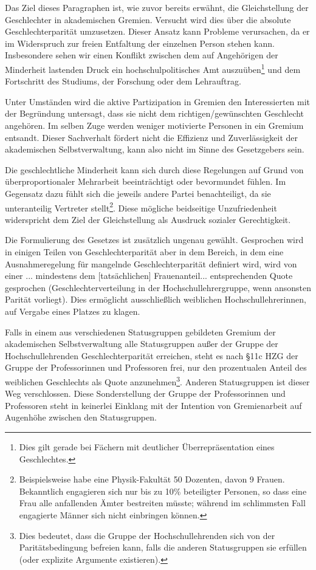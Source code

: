 \documentclass[DIV=calc]{scrartcl}
\begin{document}
Das Ziel dieses Paragraphen ist, wie zuvor bereits erwähnt, die Gleichstellung der
Geschlechter in akademischen Gremien. Versucht wird dies über die absolute Geschlechterparität
umzusetzen. Dieser Ansatz kann Probleme verursachen, da er im Widerspruch
zur freien Entfaltung der einzelnen Person stehen kann. Insbesondere sehen wir einen
Konflikt zwischen dem auf Angehörigen der Minderheit lastenden Druck ein hochschulpolitisches
Amt auszuüben\footnote{Dies gilt gerade bei Fächern mit deutlicher Überrepräsentation eines Geschlechtes.}
und dem Fortschritt des Studiums, der Forschung oder dem Lehrauftrag.

Unter Umständen wird die aktive Partizipation in Gremien den Interessierten mit der
Begründung untersagt, dass sie nicht dem richtigen/gewünschten Geschlecht angehören.
Im selben Zuge werden weniger motivierte Personen in ein Gremium entsandt. Dieser Sachverhalt
fördert nicht die Effizienz und Zuverlässigkeit der akademischen Selbstverwaltung, kann also
nicht im Sinne des Gesetzgebers sein.

Die geschlechtliche Minderheit kann sich durch diese Regelungen auf Grund von überproportionaler
Mehrarbeit beeinträchtigt oder bevormundet fühlen. Im Gegensatz dazu fühlt sich die
jeweils andere Partei benachteiligt, da sie unteranteilig Vertreter stellt\footnote{Beispielsweise
habe eine Physik-Fakultät 50 Dozenten, davon 9 Frauen. Bekanntlich engagieren sich nur bis zu 10\%
beteiligter Personen, so dass eine Frau alle anfallenden Ämter bestreiten müsste;
während im schlimmsten Fall engagierte Männer sich nicht einbringen können.}. Diese mögliche
beidseitige Unzufriedenheit widerspricht dem Ziel der Gleichstellung als Ausdruck sozialer
Gerechtigkeit.

Die Formulierung des Gesetzes ist zusätzlich ungenau gewählt. Gesprochen wird in einigen Teilen von
\glqq{}Geschlechterparität\grqq{} aber in dem Bereich, in dem eine Ausnahmeregelung für mangelnde
\glqq{}Geschlechterparität\grqq{} definiert wird, wird von einer \glqq{}... mindestens
dem [tatsächlichen] Frauenanteil...\grqq{} entsprechenden Quote gesprochen (Geschlechterverteilung
in der Hochschullehrergruppe, wenn ansonsten Parität vorliegt). Dies ermöglicht
ausschließlich weiblichen Hochschullehrerinnen, auf Vergabe eines Platzes zu klagen.

Falls in einem aus verschiedenen Statusgruppen gebildeten Gremium der akademischen
Selbstverwaltung alle Statusgruppen außer der Gruppe der Hochschullehrenden Geschlechterparität
erreichen, steht es nach §11c HZG der Gruppe der Professorinnen und Professoren frei, nur
den prozentualen Anteil des weiblichen Geschlechts als Quote anzunehmen\footnote{Dies bedeutet,
dass die Gruppe der Hochschullehrenden sich von der Paritätsbedingung befreien kann, falls die
anderen Statusgruppen sie erfüllen (oder explizite Argumente existieren).}. Anderen Statusgruppen
ist dieser Weg verschlossen. Diese Sonderstellung der Gruppe der Professorinnen und Professoren
steht in keinerlei Einklang mit der Intention von Gremienarbeit auf Augenhöhe zwischen den
Statusgruppen.
\end{document}
